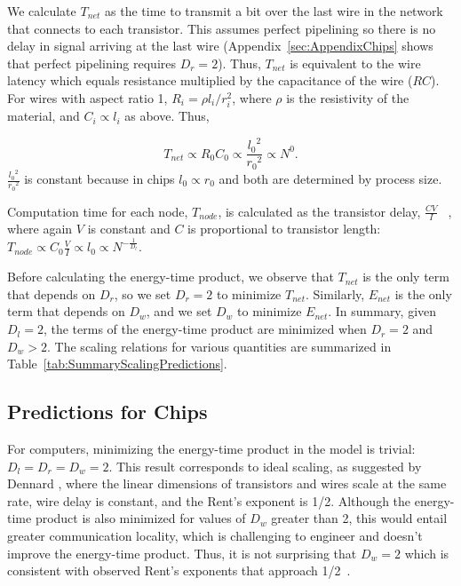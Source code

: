 \documentclass[12pt]{article}
\begin{document}
We calculate $T_{net}$ as the time to transmit a bit over the last 
wire
in the network that connects to each transistor. This assumes perfect
pipelining so there is no delay in signal arriving at the last wire
(Appendix~\ref{sec:AppendixChips} shows that perfect pipelining requires $D_r =
2$). Thus, $T_{net}$ is equivalent to the wire latency which equals resistance
multiplied by the capacitance of the wire ($RC$). For wires with aspect ratio
1, $R_i = \rho l_i /r_i^2$, where $\rho$ is the resistivity of the material,
and $C_i \propto l_i$ as above.  Thus, 

\begin{equation}
\label{eq:comp-Tnet}
T_{net} \propto R_0C_0 \propto
\frac{{l_0}^2}{{r_0}^2} \propto N^0 .
\end {equation}
\noindent $ \frac{{l_0}^2}{{r_0}^2}$ is constant
because in chips  $l_0 \propto r_0$ and both are determined by process size.

Computation time for each node, $T_{node}$, is calculated as the transistor
delay, $\frac{CV}{I}$ ~\cite{bakoglu90}, where again $V$ is constant and $C$ is
proportional to transistor length: $T_{node} \propto C_0 \frac{V}{I}  \propto
l_0  \propto N^{-\frac{1}{D_l}}$. 

Before calculating the energy-time product, we observe that $T_{net}$ is the
only term that depends on $D_r$, so we set  $D_r = 2$ to minimize
$T_{net}$. Similarly, $E_{net}$ is the only term that depends on  $D_w$, and we
set $D_w$ to minimize $E_{net}$.  In summary, given $D_l = 2$, the terms of the energy-time product are minimized
when $D_r = 2$ and $D_w > 2$. The scaling relations for various
quantities are summarized in Table~\ref{tab:SummaryScalingPredictions}.

\subsection{Predictions for Chips}
\label{sec:comp-predictions}


For computers, minimizing the energy-time product in the model is trivial: $D_l=D_r=D_w =
2$. This result corresponds to ideal scaling, as suggested by Dennard
\cite{dennard74}, where the linear dimensions of transistors and wires scale at
the same rate, wire delay is constant, and the Rent's exponent is 1/2.  Although
the energy-time product is also minimized for values of $D_w$ greater than 2,
this would entail greater communication locality, which is challenging
to engineer and doesn't improve
the energy-time product.  Thus, it is not surprising
that $D_w = 2$ which is consistent with observed
Rent's exponents that approach 1/2~\cite{yang2001wirelength, solee2013evolutionary}. 
\end{document}
